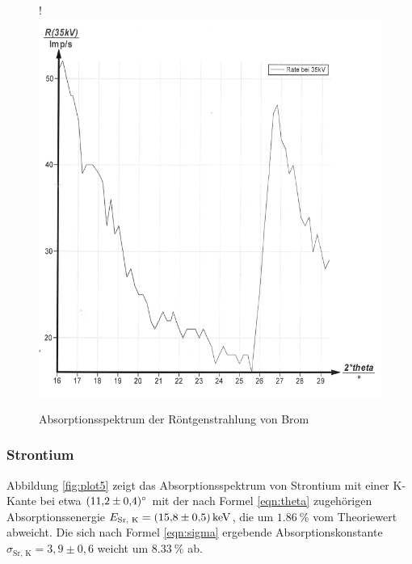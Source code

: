 \begin{figure}[H]!
  \centering
  \includegraphics[scale=0.3]{content/bild6.png}
  \caption{Absorptionsspektrum der Röntgenstrahlung von Brom}
  \label{fig:plot4}
\end{figure}

\subsubsection{Strontium}

Abbildung \ref{fig:plot5} zeigt das Absorptionsspektrum von Strontium mit einer 
K-Kante bei etwa $\SI{11.2 +- 0.4}{\degree}$ mit der nach Formel \eqref{eqn:theta}
zugehörigen Absorptionssenergie $ E_\text{Sr, K} = \SI{15.8 +- 0.5}{\kilo\eV}$,
die um $\SI{1.86}{\percent}$ vom Theoriewert abweicht. Die sich nach Formel 
\eqref{eqn:sigma} ergebende Absorptionskonstante $\sigma_\text{Sr, K} = 3,9 \pm 0,6$
weicht um $\SI{8.33}{\percent}$ ab.


